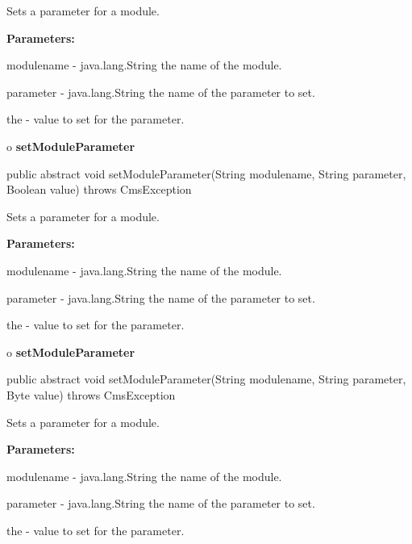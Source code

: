 \begin{description}
\htmlDD Sets a parameter for a module. 

\begin{description}
\item {\bf Parameters:}  

modulename - java.lang.String the name of the module.  

parameter - java.lang.String the name of the parameter to set.  

the - value to set for the parameter.  
\end{description}

\end{description}

o {\bf setModuleParameter} 

\begin{PRE}
 public abstract void setModuleParameter(String modulename,
                                         String parameter,
                                         Boolean value) throws CmsException
\end{PRE}

\begin{description}
\htmlDD Sets a parameter for a module. 

\begin{description}
\item {\bf Parameters:}  

modulename - java.lang.String the name of the module.  

parameter - java.lang.String the name of the parameter to set.  

the - value to set for the parameter.  
\end{description}

\end{description}

o {\bf setModuleParameter} 

\begin{PRE}
 public abstract void setModuleParameter(String modulename,
                                         String parameter,
                                         Byte value) throws CmsException
\end{PRE}

\begin{description}
\htmlDD Sets a parameter for a module. 

\begin{description}
\item {\bf Parameters:}  

modulename - java.lang.String the name of the module.  

parameter - java.lang.String the name of the parameter to set.  

the - value to set for the parameter.  
\end{description}

\end{description}

